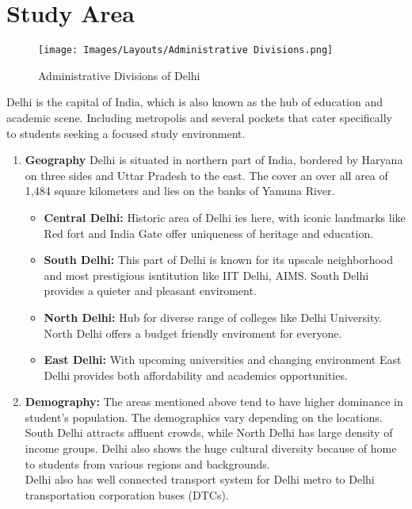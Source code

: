 \documentclass[12pt]{report}
\begin{document}
\chapter{Study Area}
\begin{figure}[H]
    \centering
    \texttt{[image: Images/Layouts/Administrative Divisions.png]}
    \caption{Administrative Divisions of Delhi}
\end{figure}
Delhi is the capital of India, which is also known as the hub of education and
academic scene. Including metropolis and several pockets that cater specifically to
students seeking a focused study environment.\\
\begin{enumerate}
    \item \textbf{Geography}
    Delhi is situated in northern part of India, bordered by Haryana on three sides and
    Uttar Pradesh to the east. The cover an over all area of 1,484 square kilometers and lies on the banks of Yamuna River.
    \begin{itemize}
        \item \textbf{Central Delhi:} Historic area of Delhi ies here, with iconic landmarks like Red fort and India Gate offer uniqueness of heritage and education.
        \item \textbf{South Delhi:} This part of Delhi is known for its upscale neighborhood and most prestigious isntitution like IIT Delhi, AIMS. South Delhi provides a quieter and pleasant enviroment.
        \item \textbf{North Delhi:} Hub for diverse range of colleges like Delhi University. North Delhi offers a budget friendly enviroment for everyone.
        \item \textbf{East Delhi:} With upcoming universities and changing environment East Delhi provides both affordability and academics opportunities.
    \end{itemize}
    \item \textbf{Demography:}
    The areas mentioned above tend to have higher dominance in student's population. The demographics vary depending on the locations. South Delhi attracts affluent crowds, while North Delhi has large density of income groups. Delhi also shows the huge cultural diversity because of home to students from various regions and backgrounds.\\
    Delhi also has well connected transport system for Delhi metro to Delhi transportation corporation buses (DTCs).
\end{enumerate}
\end{document}
